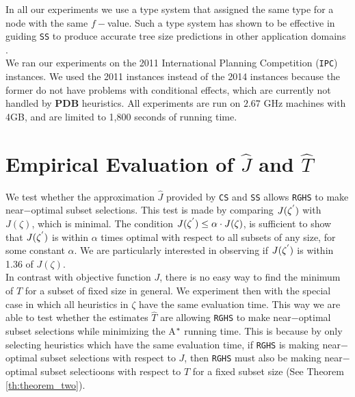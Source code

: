 In all our experiments we use a type system that assigned the same type for a node with the same $f-$value. Such a type system has shown to be effective in guiding \texttt{SS} to produce accurate tree size predictions in other application domains \cite{lelis2013predicting,lelis2014memory}.\\

We ran our experiments on the 2011 International Planning Competition (\texttt{IPC}) instances. We used the 2011 instances instead of the 2014 instances because the former do not have problems with conditional effects, which are currently not handled by \textbf{PDB} heuristics. All experiments are run on $2.67$ GHz machines with 4GB, and are limited to 1,800 seconds of running time.\\

\section{Empirical Evaluation of $\hat{J}$ and $\hat{T}$}
\noindent
We test whether the approximation $\hat{J}$ provided by \texttt{CS} and \texttt{SS} allows \texttt{RGHS} to make near$-$optimal subset selections. This test is made by comparing $J(\zeta\sp{'})$ with $J(\zeta)$, which is minimal. The condition $J(\zeta\sp{'}) \leq \alpha \cdot J(\zeta)$, is sufficient to show that $J(\zeta\sp{'})$ is within $\alpha$ times optimal with respect to all subsets of any size, for some constant $\alpha$. We are particularly interested in observing if $J(\zeta\sp{'})$ is within 1.36 of $J(\zeta)$.\\

In contrast with objective function $J$, there is no easy way to find the minimum of $T$ for a subset of fixed size in general. We experiment then with the special case in which all heuristics in $\zeta$ have the same evaluation time. This way we are able to test whether the estimates $\hat{T}$ are allowing \texttt{RGHS} to make near$-$optimal subset selections while minimizing the A$\sp{*}$ running time. This is because by only selecting heuristics which have the same evaluation time, if \texttt{RGHS} is making near$-$optimal subset selections with respect to $J$, then \texttt{RGHS} must also be making near$-$optimal subset selectioons with respect to $T$ for a fixed subset size (See Theorem \ref{th:theorem_two}).\\

